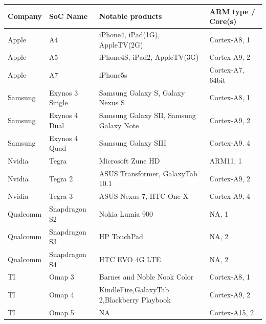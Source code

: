 \documentclass[letterpaper,10pt,english]{sphinxmanual}
\begin{document}
\begin{tabulary}{\linewidth}{|L|L|L|L|}
\hline
\textbf{
Company
} & \textbf{
SoC Name
} & \textbf{
Notable products
} & \textbf{
ARM type / Core(s)
}\\\hline

Apple
 & 
A4
 & 
iPhone4, iPad(1G), AppleTV(2G)
 & 
Cortex-A8, 1
\\\hline

Apple
 & 
A5
 & 
iPhone4S, iPad2, AppleTV(3G)
 & 
Cortex-A9, 2
\\\hline

Apple
 & 
A7
 & 
iPhone5s
 & 
Cortex-A7, 64bit
\\\hline

Samsung
 & 
Exynos 3 Single
 & 
Samsung Galaxy S, Galaxy Nexus S
 & 
Cortex-A8, 1
\\\hline

Samsung
 & 
Exynos 4 Dual
 & 
Samsung Galaxy SII, Samsung Galaxy Note
 & 
Cortex-A9, 2
\\\hline

Samsung
 & 
Exynos 4 Quad
 & 
Samsung Galaxy SIII
 & 
Cortex-A9. 4
\\\hline

Nvidia
 & 
Tegra
 & 
Microsoft Zune HD
 & 
ARM11, 1
\\\hline

Nvidia
 & 
Tegra 2
 & 
ASUS Transformer, GalaxyTab 10.1
 & 
Cortex-A9, 2
\\\hline

Nvidia
 & 
Tegra 3
 & 
ASUS Nexus 7, HTC One X
 & 
Cortex-A9, 4
\\\hline

Qualcomm
 & 
Snapdragon S2
 & 
Nokia Lumia 900
 & 
NA, 1
\\\hline

Qualcomm
 & 
Snapdragon S3
 & 
HP TouchPad
 & 
NA, 2
\\\hline

Qualcomm
 & 
Snapdragon S4
 & 
HTC EVO 4G LTE
 & 
NA, 2
\\\hline

TI
 & 
Omap 3
 & 
Barnes and Noble Nook Color
 & 
Cortex-A8, 1
\\\hline

TI
 & 
Omap 4
 & 
KindleFire,GalaxyTab 2,Blackberry Playbook
 & 
Cortex-A9, 2
\\\hline

TI
 & 
Omap 5
 & 
NA
 & 
Cortex-A15, 2
\\\hline
\end{tabulary}
\end{document}
